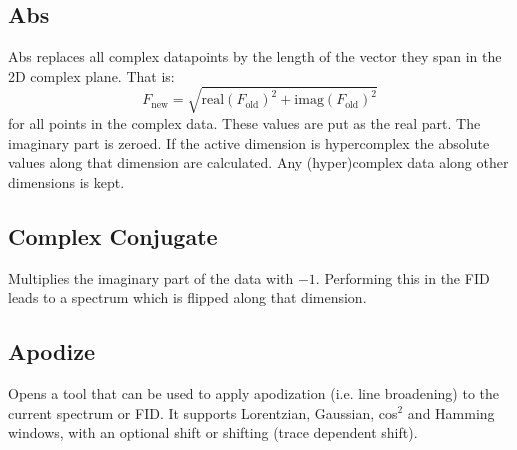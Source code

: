 \documentclass[11pt,a4paper]{article}
\begin{document}
\subsection{Abs}
Abs replaces all complex datapoints by the length of the vector they span in the 2D complex plane. That is:
\begin{equation*}
F_\text{new} = \sqrt{\text{real}(F_\text{old})^2 + \text{imag}(F_\text{old})^2}
\end{equation*}
for all points in the complex data. These values are put as the real part. The imaginary part is zeroed. If the active dimension is hypercomplex the absolute values along that dimension are calculated. Any (hyper)complex data along other dimensions is kept.


\subsection{Complex Conjugate}
Multiplies the imaginary part of the data with $-1$. Performing this in the FID leads to a spectrum which is flipped along that dimension.




\subsection{Apodize}
Opens a tool that can be used to apply apodization (i.e. line broadening) to the current spectrum or FID. It supports Lorentzian, Gaussian, cos$^2$ and Hamming windows, with an optional shift or shifting (trace dependent shift).


\end{document}
